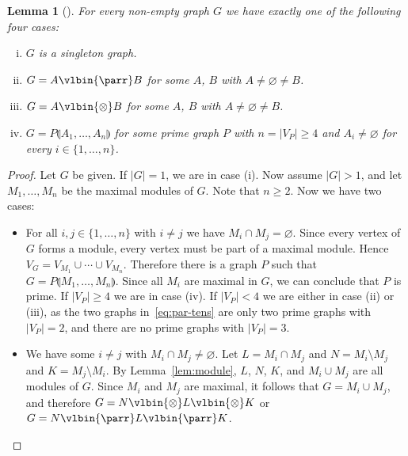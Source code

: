 \documentclass{lmcs} %
\renewcommand{\emptyset}{\varnothing}
\def\unit{\emptyset}
\newcommand{\connn}[1]{\llparenthesis#1\rrparenthesis}
\def\set#1{\{#1\}}
\def\lpar{\vlbin{\parr}}
\def\ltens{\vlbin{\otimes}}
\def\gA{A}
\def\gB{B}
\def\gG{G}
\def\gK{K}
\def\gL{L}
\def\gM{M}
\def\gN{N}
\def\gP{P}
\newcommand{\vertices}[1][]{V_{#1}}
\newcommand{\vG}{\vertices[G]}
\newcommand{\vP}{\vertices[P]}
\newcommand{\sizeof}[1]{|#1|}
\theoremstyle{plain}
\newtheorem{lemma}[thm]{Lemma}
\begin{document}
\begin{lemma}[\cite{gallai:67}]
\label{lem:newhope}
  For every non-empty graph $\gG$ we have exactly one of the following four cases:
  \begin{enumerate}[(i)]
  \item $\gG$ is a singleton graph.
  \item $\gG=\gA\lpar\gB$ for some $\gA$, $\gB$ with $\gA\neq\unit\neq\gB$.
  \item $\gG=\gA\ltens\gB$ for some $\gA$, $\gB$ with $\gA\neq\unit\neq\gB$.
  \item $\gG=\gP\connn{\gA_1,\ldots,\gA_n}$ for some prime graph $\gP$
    with $n=\sizeof{\vP}\ge 4$ and $\gA_i\neq\unit$ for every $i\in\set{1,\ldots,n}$.
  \end{enumerate}
\end{lemma}

\begin{proof}
  Let $\gG$ be given. If $\sizeof\gG=1$, we are in case (i). Now
  assume $\sizeof\gG>1$, and let $\gM_1,\ldots,\gM_n$ be the maximal
  modules of $\gG$. Note that $n\geq 2$. Now we have two cases:
  \begin{itemize}
  \item For all $i,j\in\set{1,\ldots,n}$ with $i\neq j$ we have
    $\gM_i\cap \gM_j=\unit$.  Since every vertex of $\gG$ forms a
    module, every vertex must be part of a maximal module. Hence
    $\vG=\vertices[\gM_1]\cup\cdots\cup\vertices[\gM_n]$. Therefore
    there is a graph $\gP$ such that
    $\gG=\gP\connn{M_1,\ldots,M_n}$. Since all $\gM_i$ are maximal in
    $\gG$, we can conclude that $\gP$ is prime. If $\sizeof{\vP}\ge 4$
    we are in case (iv). If $\sizeof{\vP}<4$ we are either in case
    (ii) or (iii), as the two graphs in~\eqref{eq:par-tens} are only
    two prime graphs with $\sizeof{\vP}=2$, and there are no prime
    graphs with $\sizeof{\vP}=3$.
  \item We have some $i\neq j$ with $\gM_i\cap \gM_j\neq\unit$. Let
    $\gL=\gM_i\cap \gM_j$ and $\gN=\gM_i\setminus\gM_j$ and
    $\gK=\gM_j\setminus\gM_i$. By Lemma~\ref{lem:module}, $L$, $N$,
    $K$, and $\gM_i\cup\gM_j$ are all modules of $\gG$. Since $\gM_i$
    and $\gM_j$ are maximal, it follows that $\gG=\gM_i\cup\gM_j$, and
    therefore $\gG=N\ltens L\ltens K$ or $G=N\lpar L\lpar K$. \qedhere
  \end{itemize}
\end{proof}
\end{document}
